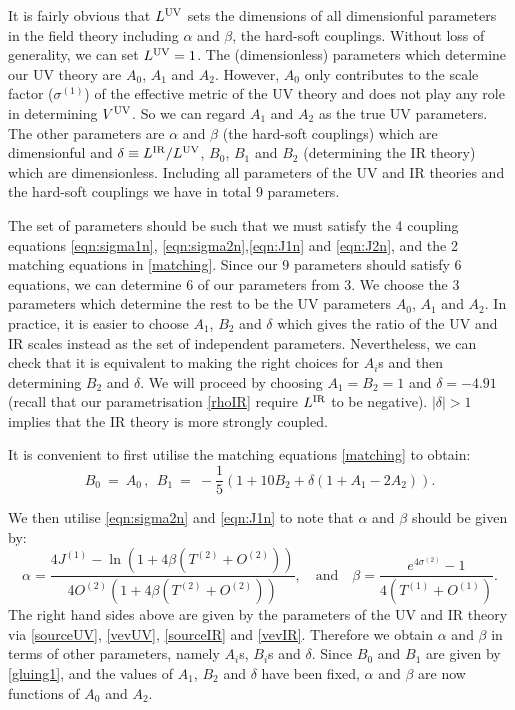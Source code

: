 \documentclass[prd,reprint,a4paper,showpacs,superscriptaddress,11pt,onecolumn,nofootinbib]{revtex4-1}
\renewcommand{\(}{\left(}
\renewcommand{\)}{\right)}
\newcommand{\6}{\partial}
\begin{document}
It is fairly obvious that $L^{\rm UV}$ sets the dimensions of all dimensionful parameters in the field theory including $\alpha$ and $\beta$, the hard-soft couplings. Without loss of generality, we can set $L^{\rm UV} = 1$. The (dimensionless) parameters which determine our UV theory are $A_0$, $A_1$ and $A_2$. However, $A_0$ only contributes to the scale factor ($\sigma^{(1)}$) of the effective metric of the UV theory and does not play any role in determining $V^{\rm UV}$. So we can regard $A_1$ and $A_2$ as the true UV parameters. The other parameters are $\alpha$ and $\beta$ (the hard-soft couplings) which are dimensionful and $\delta \equiv L^{\rm IR}/L^{\rm UV}$, $B_0$, $B_1$ and $B_2$ (determining the IR theory) which are dimensionless. Including all parameters of the UV and IR theories and the hard-soft couplings we have in total 9 parameters.

The set of parameters should be such that we must satisfy the 4 coupling equations \eqref{eqn:sigma1n}, \eqref{eqn:sigma2n},\eqref{eqn:J1n} and \eqref{eqn:J2n}, and the 2 matching equations in \eqref{matching}. Since our 9 parameters should satisfy 6 equations, we can determine 6 of our parameters from 3. We choose the 3 parameters which determine the rest to be the UV parameters $A_0$, $A_1$ and $A_2$. In practice, it is easier to choose $A_1$, $B_2$ and $\delta$ which gives the ratio of the UV and IR scales instead as the set of independent parameters. Nevertheless, we can check that it is equivalent to making the right choices for $A_i$s and then determining $B_2$ and $\delta$. We will proceed by choosing $A_1 = B_2 = 1$ and $\delta = -4.91$ (recall that our parametrisation \eqref{rhoIR} require $L^{\rm IR}$ to be negative). $\vert \delta \vert > 1$ implies that the IR theory is more strongly coupled.

It is convenient to first utilise the matching equations \eqref{matching} to obtain:
\begin{equation}
\label{gluing1}
B_0 ~ = ~ A_0  \, , ~~ B_1 ~ = ~ - \dfrac{1}{5}  \left(1 + 10 B_2 + \delta \left(1+ A_1 - 2 A_2\right)\right).
\end{equation}

We then utilise \eqref{eqn:sigma2n} and \eqref{eqn:J1n} to note that $\alpha$ and $\beta$ should be given by:
\begin{equation}\label{a&b}
\alpha = \frac{4J^{(1)} -\ln(1 + 4\beta(T^{(2)}+O^{(2)}))}{4O^{(2)}(1 + 4\beta(T^{(2)}+O^{(2)}))}, \quad \text{and} \quad \beta = \frac{e^{4\sigma^{(2)}}-1}{4(T^{(1)} + O^{(1)})}.
\end{equation}
The right hand sides above are given by the parameters of the UV and IR theory via \eqref{sourceUV}, \eqref{vevUV}, \eqref{sourceIR} and \eqref{vevIR}. Therefore we obtain $\alpha$ and $\beta$ in terms of other parameters, namely $A_i$s, $B_i$s and $\delta$. Since $B_0$ and $B_1$ are given by \eqref{gluing1}, and the values of $A_1$, $B_2$ and $\delta$ have been fixed, $\alpha$ and $\beta$ are now functions of $A_0$ and $A_2$. 
\end{document}
